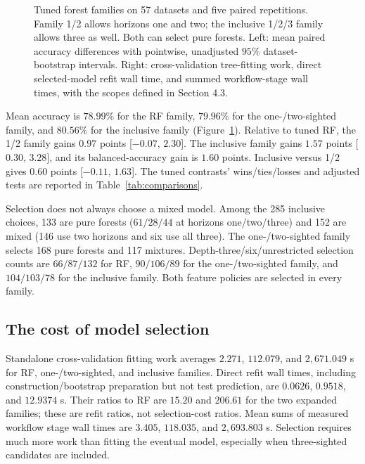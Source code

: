 \documentclass[final,5p,times]{elsarticle}
\begin{document}
\begin{figure}[t]
\par\smallskip{}
\caption{Tuned forest families on 57 datasets and five paired repetitions. Family 1/2 allows horizons one and two; the inclusive 1/2/3 family allows three as well. Both can select pure forests. Left: mean paired accuracy differences with pointwise, unadjusted $95\%$ dataset-bootstrap intervals. Right: cross-validation tree-fitting work, direct selected-model refit wall time, and summed workflow-stage wall times, with the scopes defined in Section 4.3.}
\label{fig:tuned}
\end{figure}

Mean accuracy is $78.99\%$ for the RF family, $79.96\%$ for the
one-/two-sighted family, and $80.56\%$ for the inclusive family
(Figure~\ref{fig:tuned}). Relative to tuned RF, the 1/2 family gains
$0.97$ points [$-0.07$, $2.30$]. The inclusive family gains $1.57$
points [$0.30$, $3.28$], and its balanced-accuracy gain is $1.60$
points. Inclusive versus 1/2 gives $0.60$ points [$-0.11$, $1.63$].
The tuned contrasts' wins/ties/losses and adjusted tests are reported
in Table~\ref{tab:comparisons}.

Selection does not always choose a mixed model. Among the 285
inclusive choices, 133 are pure forests ($61/28/44$ at horizons
one/two/three) and 152 are mixed (146 use two horizons and six use all three).
The one-/two-sighted family selects 168 pure forests and 117
mixtures.
Depth-three/six/unrestricted selection counts are $66/87/132$ for RF,
$90/106/89$ for the one-/two-sighted family, and $104/103/78$ for
the inclusive family. Both feature policies are selected in every family.

\subsection{The cost of model selection}
Standalone cross-validation fitting work averages $2.271$, $112.079$,
and $2,671.049$ s for RF, one-/two-sighted, and inclusive families.
Direct refit
wall times, including construction/bootstrap preparation but not
test prediction, are $0.0626$, $0.9518$, and $12.9374$ s. Their
ratios to RF are $15.20$ and $206.61$ for the two expanded families;
these are refit ratios, not selection-cost ratios. Mean sums of
measured workflow stage wall times are $3.405$, $118.035$, and
$2,693.803$ s. Selection requires much more work than fitting the
eventual model, especially when three-sighted candidates are included.
\end{document}
